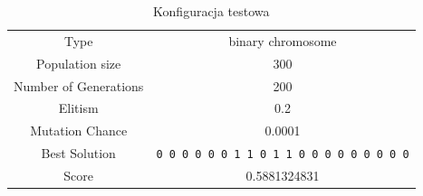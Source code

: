 \documentclass{llncs}
\begin{document}
\begin{table}[H]
\caption{Konfiguracja testowa}
\label{big}
\centering
\begin{tabular}{|c|c|}
  Type                  & binary chromosome \\
  Population size       & 300 \\ 
  Number of Generations & 200 \\
  Elitism               & 0.2 \\
  Mutation Chance       & 0.0001 \\
  Best Solution & \texttt{0 0 0 0 0 0 1 1 0 1 1 0 0 0 0 0 0 0 0 0} \\
  Score & 0.5881324831 \\
\end{tabular} 

\end{table}
  
\end{document}
